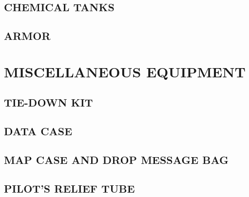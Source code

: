 \subsection{CHEMICAL TANKS}
\subsection{ARMOR}


\section{MISCELLANEOUS EQUIPMENT}
\subsection{TIE-DOWN KIT}
\subsection{DATA CASE}
\subsection{MAP CASE AND DROP MESSAGE BAG}
\subsection{PILOT'S RELIEF TUBE}


\cleardoublepage{}